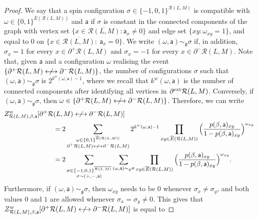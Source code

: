 \documentclass[11pt,a4paper]{article}
\numberwithin{equation}{section}
\theoremstyle{plain}
\theoremstyle{definition}
\newcommand\fg{\mathfrak{g}}
\begin{document}
\begin{proof}
We say that a spin configuration $\sigma\in \{-1,0,1\}^{\overline{\mathcal{R}(L,M)}}$ is compatible with $\omega\in \{0,1\}^{\overline{E}(\mathcal{R}(L,M))}$ and $\mathsf{a}$ if $\sigma$ is constant in the connected components of the graph with vertex set $\{x\in \overline{\mathcal{R}(L,M)}: \mathsf{a}_x\neq 0\}$ and edge set $\{xy: \omega_{xy}=1\}$, and equal to $0$ on $\{x\in \overline{\mathcal{R}(L,M)}:\: \mathsf{a}_x=0\}$.  We write $(\omega,\mathsf{a})\sim_{\fg}\sigma$ if, in addition, $\sigma_x=1$ for every $x\in \partial^+\mathcal{R}(L,M)$ and $\sigma_x=-1$ for every $x\in \partial^-\mathcal{R}(L,M)$. Note that, given $\mathsf{a}$ and a configuration $\omega$ realising the event $\{\partial^+\mathcal{R}(L,M)\centernot\longleftrightarrow \partial^-\mathcal{R}(L,M)\}$, the number of configurations $\sigma$ such that $(\omega,\mathsf{a})\sim_{\fg}\sigma$ is $2^{ k^w(\omega,\mathsf{a})-1}$, where we recall that $k^w(\omega,\mathsf{a})$ is the number of connected components after identifying all vertices in $\partial^{\textup{ext}}\mathcal{R}(L,M)$. Conversely, if $(\omega,\mathsf{a})\sim_{\mathfrak g} \sigma$, then $\omega \in \{\partial^+\mathcal{R}(L,M)\centernot\longleftrightarrow \partial^-\mathcal{R}(L,M)\}$. Therefore, we can write
\begin{align}
\begin{aligned}
Z^w_{\mathcal{R}(L,M),\beta,\mathsf{a}}[\partial^+\mathcal{R}&(L,M)\centernot\longleftrightarrow \partial^-\mathcal{R}(L,M)]
\\&=2 \sum_{\substack{\omega\in \{0,1\}^{\overline{E}(\mathcal{R}(L,M))}\\ \partial^+\mathcal{R}(L,M)\centernot\longleftrightarrow \partial^-\mathcal{R}(L,M)}}2^{k^w(\omega,\mathsf{a})-1}\prod_{xy \in \overline{E}(\mathcal{R}(L,M))} \Big(\frac{p(\beta,\mathsf{a})_{xy}}{1-p(\beta,\mathsf{a})_{xy}}\Big)^{\omega_{xy}} 
\\&= 2 \sum_{\substack{\sigma\in \{-1,0,1\}^{\overline{\mathcal{R}(L,M)}}\\\sigma\sim (+,-,\mathsf{a})}} \sum_{(\omega,\mathsf{a})\sim_\fg \sigma}\prod_{xy \in \overline{E}(\mathcal{R}(L,M))} \Big(\frac{p(\beta,\mathsf{a})_{xy}}{1-p(\beta,\mathsf{a})_{xy}}\Big)^{\omega_{xy}}. 
\end{aligned}
\end{align}
Furthermore, if $(\omega,\mathsf{a})\sim_\fg \sigma$, then $\omega_{xy}$ needs to be $0$ whenever $\sigma_x\neq \sigma_y$, and both values $0$ and $1$ are allowed whenever $\sigma_x=\sigma_y\neq 0$. This gives that $Z^w_{\mathcal{R}(L,M),\beta,\mathsf{a}}[\partial^+\mathcal{R}(L,M)\centernot\longleftrightarrow \partial^-\mathcal{R}(L,M)]$ is equal to

\end{proof}
\end{document}
